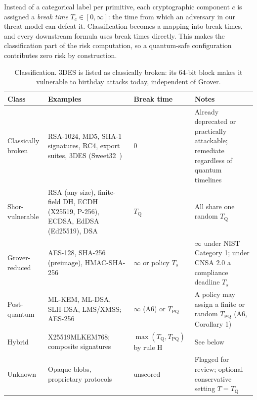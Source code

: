 \documentclass[conference]{IEEEtran}
\newcommand{\Tq}{T_{\mathrm{Q}}}
\begin{document}
Instead of a categorical label per primitive, each cryptographic component $c$ is assigned a \emph{break time} $T_c \in [0, \infty]$: the time from which an adversary in our threat model can defeat it. Classification becomes a mapping into break times, and every downstream formula uses break times directly. This makes the classification part of the risk computation, so a quantum-safe configuration contributes zero risk by construction.
\begin{table}[!t]
\centering\footnotesize
\caption{Classification. 3DES is listed as classically broken: its 64-bit block makes it vulnerable to birthday attacks today, independent of Grover.}\label{tab:2}
\begin{tabularx}{\linewidth}{>{\raggedright\arraybackslash}X>{\raggedright\arraybackslash}X>{\raggedright\arraybackslash}X>{\raggedright\arraybackslash}X}
\toprule
\textbf{Class} & \textbf{Examples} & \textbf{Break time} & \textbf{Notes} \\ \midrule
Classically broken & RSA-1024, MD5, SHA-1 signatures, RC4, export suites, 3DES (Sweet32~\cite{bhargavan2016}) & $0$ & Already deprecated or practically attackable; remediate regardless of quantum timelines \\
Shor-vulnerable & RSA (any size), finite-field DH, ECDH (X25519, P-256), ECDSA, EdDSA (Ed25519), DSA & $\Tq$ & All share one random $\Tq$ \\
Grover-reduced & AES-128, SHA-256 (preimage), HMAC-SHA-256 & $\infty$ or policy $T_s$ & $\infty$ under NIST Category 1; under CNSA 2.0 a compliance deadline $T_s$ \\
Post-quantum & ML-KEM, ML-DSA, SLH-DSA, LMS/XMSS; AES-256 & $\infty$ (A6) or $T_{\mathrm{PQ}}$ & A policy may assign a finite or random $T_{\mathrm{PQ}}$ (A6, Corollary 1) \\
Hybrid & X25519MLKEM768; composite signatures & $\max(\Tq, T_{\mathrm{PQ}})$ by rule H & See below \\
Unknown & Opaque blobs, proprietary protocols & unscored & Flagged for review; optional conservative setting $T = \Tq$ \\
\bottomrule
\end{tabularx}
\end{table}
\end{document}
